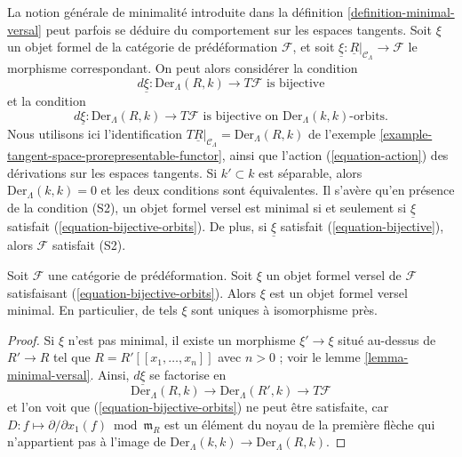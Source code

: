 \noindent
La notion générale de minimalité introduite dans la définition
\ref{definition-minimal-versal} peut parfois se déduire du comportement sur
les espaces tangents. Soit $\xi$ un objet formel de la catégorie de
prédéformation $\mathcal{F}$, et soit
$\underline{\xi} : \underline{R}|_{\mathcal{C}_\Lambda} \to \mathcal{F}$
le morphisme correspondant. On peut alors considérer la condition
\begin{equation}
\label{equation-bijective}
d\underline{\xi} : \text{Der}_\Lambda(R, k) \to T\mathcal{F} 
\text{ is bijective}
\end{equation}
et la condition
\begin{equation}
\label{equation-bijective-orbits}
d\underline{\xi} : \text{Der}_\Lambda(R, k) \to T\mathcal{F} 
\text{ is bijective on }\text{Der}_\Lambda(k, k)\text{-orbits.}
\end{equation}
Nous utilisons ici l'identification
$T\underline{R}|_{\mathcal{C}_\Lambda} = \text{Der}_\Lambda(R, k)$ de
l'exemple \ref{example-tangent-space-prorepresentable-functor}, ainsi que
l'action (\ref{equation-action}) des dérivations sur les espaces tangents. Si
$k' \subset k$ est séparable, alors $\text{Der}_\Lambda(k, k) = 0$ et les deux
conditions sont équivalentes. Il s'avère qu'en présence de la condition (S2),
un objet formel versel est minimal si et seulement si $\underline{\xi}$
satisfait (\ref{equation-bijective-orbits}). De plus, si $\underline{\xi}$
satisfait (\ref{equation-bijective}), alors $\mathcal{F}$ satisfait (S2).

\begin{lemma}
\label{lemma-miniversal-object-unique}
Soit $\mathcal{F}$ une catégorie de prédéformation. Soit $\xi$ un objet
formel versel de $\mathcal{F}$ satisfaisant
(\ref{equation-bijective-orbits}). Alors $\xi$ est un objet formel versel
minimal. En particulier, de tels $\xi$ sont uniques à isomorphisme près.
\end{lemma}

\begin{proof}
Si $\xi$ n'est pas minimal, il existe un morphisme $\xi' \to \xi$ situé
au-dessus de $R' \to R$ tel que $R = R'[[x_1, \ldots, x_n]]$ avec $n > 0$ ;
voir le lemme \ref{lemma-minimal-versal}. Ainsi, $d\underline{\xi}$ se
factorise en
$$
\text{Der}_\Lambda(R, k) \to
\text{Der}_\Lambda(R', k) \to T\mathcal{F}
$$
et l'on voit que (\ref{equation-bijective-orbits}) ne peut être satisfaite,
car $D : f \mapsto \partial/\partial x_1(f) \bmod \mathfrak m_R$ est un
élément du noyau de la première flèche qui n'appartient pas à l'image de
$\text{Der}_\Lambda(k, k) \to \text{Der}_\Lambda(R, k)$.
\end{proof}

